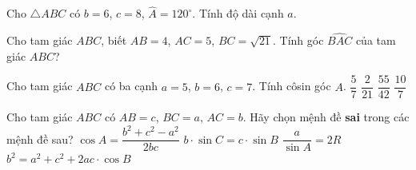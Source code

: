 

\begin{ex}%
	 Cho $\triangle ABC$ có $b=6$, $c=8$, $\hat{A}=120^{\circ}$. Tính độ dài cạnh $a$.
\end{ex}

\begin{ex}%
	Cho tam giác  $ABC$, biết $AB=4$, $AC=5$, $BC=\sqrt{21}$. Tính góc $\widehat{BAC}$ của tam giác $ABC$?
\end{ex}

\begin{ex}%
	Cho tam giác $ABC$ có  ba cạnh $a=5$, $b=6$, $c=7$. Tính côsin góc $A$.
	 \choice
		{\True  $\dfrac{5}{7}$}
		 {$\dfrac{2}{21}$}
		 {$\dfrac{55}{42}$}
		 {$\dfrac{10}{7}$}
\end{ex}

\begin{ex}%
	Cho tam giác $ABC$ có $AB=c$, $BC=a$, $AC=b$. Hãy chọn mệnh đề  \textbf{sai} trong các mệnh đề sau?
	 \choice
		 {$\cos A=\dfrac{b^2+c^2-a^2}{2bc}$}
		{$b\cdot\sin C=c\cdot\sin  B$}
		{$\dfrac{a}{\sin A}=2R$} 
		{\True $b^2=a^2+c^2+2ac\cdot\cos B$} 
\end{ex}

